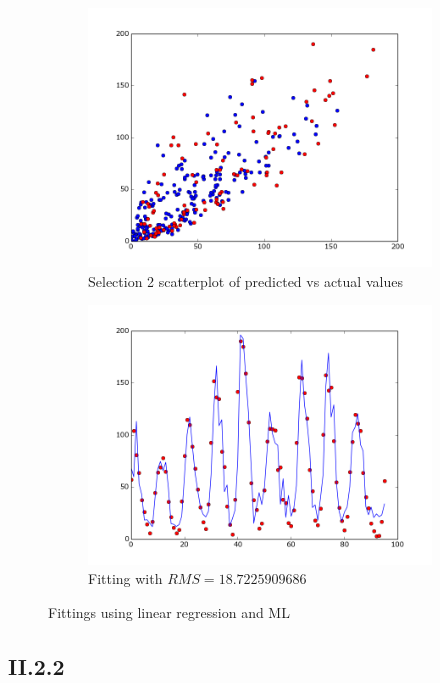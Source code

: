 \documentclass{article}
\begin{document}
\begin{figure}[!ht]
\begin{subfigure}[b]{0.47\textwidth}
        \includegraphics[width=\textwidth]{Part2/II212Scatter.png}
        \caption{Selection 2 scatterplot of predicted vs actual values}
    \end{subfigure}
    \begin{subfigure}[b]{0.47\textwidth}
        \includegraphics[width=\textwidth]{Part2/II213.png}
        \caption{Fitting with $RMS = 18.7225909686$}
    \end{subfigure}
    \caption{Fittings using linear regression and ML}
    \label{fig:II21}
\end{figure}


\subsection{II.2.2}
\end{document}
